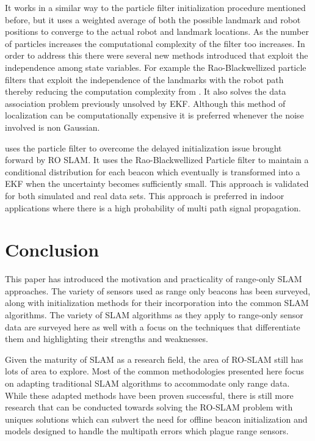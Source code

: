 \documentclass[conference]{IEEEtran}
\begin{document}
It works in a similar way to the particle filter initialization procedure mentioned before, but it uses a weighted average of both the possible landmark and robot positions to converge to the actual robot and landmark locations.
As the number of particles increases the computational complexity of the filter too increases. In order to address this there were several new methods introduced that  exploit the independence among state variables. For example the Rao-Blackwellized particle filters that exploit the independence of the landmarks with the robot path thereby reducing the computation complexity from \cite{Yuan2012}. It also solves the data association problem previously unsolved by EKF. Although this method of localization can be computationally expensive it is preferred whenever the noise involved is non Gaussian.
	

   \cite{Blanco2008a} uses the particle filter to overcome the delayed initialization issue brought forward by RO SLAM. It uses the Rao-Blackwellized Particle filter to maintain a conditional distribution for each beacon which eventually is transformed into a EKF when the uncertainty becomes sufficiently small. This approach is validated for both simulated and real data sets. This approach is preferred in indoor applications where there is a high probability of multi path signal propagation.

	
	
	
	
	
	
	
	
	
	
	
	
	
	
	
	
	\section{Conclusion}
	\label{conclusion}
	This paper has introduced the motivation and practicality of range-only SLAM approaches. The variety of sensors used as range only beacons has been surveyed, along with initialization methods for their incorporation into the common SLAM algorithms. The variety of SLAM algorithms as they apply to range-only sensor data are surveyed here as well with a focus on the techniques that differentiate them and highlighting their strengths and weaknesses.

	Given the maturity of SLAM as a research field, the area of RO-SLAM still has lots of area to explore. Most of the common methodologies presented here focus on adapting traditional SLAM algorithms to accommodate only range data. While these adapted methods have been proven successful, there is still more research that can be conducted towards solving the RO-SLAM problem with uniques solutions which can subvert the need for offline beacon initialization and models designed to handle the multipath errors which plague range sensors.
	
	
	
	
	
	
	
	
	
	
\end{document}

